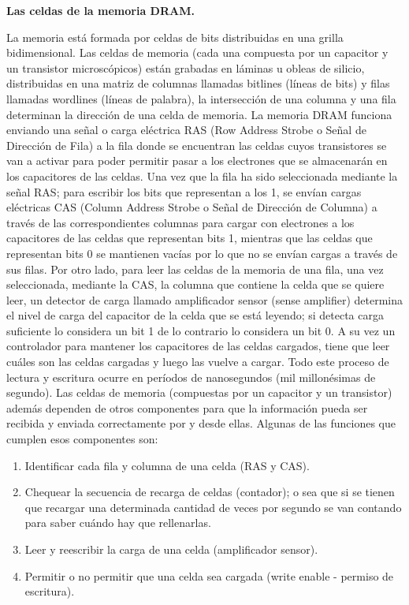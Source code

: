 \documentclass{article}
\begin{document}
\textbf{Las celdas de la memoria DRAM.}

La memoria está formada por celdas de bits distribuidas en una grilla bidimensional. Las celdas
de memoria (cada una compuesta por un capacitor y un transistor microscópicos) están
grabadas en láminas u obleas de silicio, distribuidas en una matriz de columnas
llamadas bitlines (líneas de bits) y filas llamadas wordlines (líneas de palabra), la intersección
de una columna y una fila determinan la dirección de una celda de memoria.
La memoria DRAM funciona enviando una señal o carga eléctrica RAS (Row Address Strobe o
Señal de Dirección de Fila) a la fila donde se encuentran las celdas cuyos transistores se van a
activar para poder permitir pasar a los electrones que se almacenarán en los capacitores de las
celdas. Una vez que la fila ha sido seleccionada mediante la señal RAS; para escribir los bits que
representan a los 1, se envían cargas eléctricas CAS (Column Address Strobe o Señal de
Dirección de Columna) a través de las correspondientes columnas para cargar con electrones a
los capacitores de las celdas que representan bits 1, mientras que las celdas que representan
bits 0 se mantienen vacías por lo que no se envían cargas a través de sus filas.
Por otro lado, para leer las celdas de la memoria de una fila, una vez seleccionada, mediante la
CAS, la columna que contiene la celda que se quiere leer, un detector de carga
llamado amplificador sensor (sense amplifier) determina el nivel de carga del capacitor de la
celda que se está leyendo; si detecta carga suficiente lo considera un bit 1 de lo contrario lo
considera un bit 0.
A su vez un controlador para mantener los capacitores de las celdas cargados, tiene que leer
cuáles son las celdas cargadas y luego las vuelve a cargar. Todo este proceso de lectura y
escritura ocurre en períodos de nanosegundos (mil millonésimas de segundo).
Las celdas de memoria (compuestas por un capacitor y un transistor) además dependen de
otros componentes para que la información pueda ser recibida y enviada correctamente por y
desde ellas. Algunas de las funciones que cumplen esos componentes son:
\begin{enumerate}
    \item Identificar cada fila y columna de una celda (RAS y CAS).
    \item Chequear la secuencia de recarga de celdas (contador); o sea que si se tienen que recargar una determinada cantidad de veces por segundo se van contando para saber cuándo hay que rellenarlas.
    \item Leer y reescribir la carga de una celda (amplificador sensor).
    \item Permitir o no permitir que una celda sea cargada (write enable - permiso de escritura).
\end{enumerate}
\end{document}
